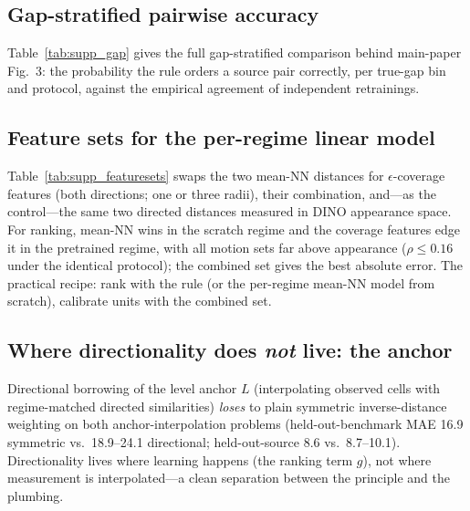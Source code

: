 \documentclass[runningheads]{llncs}
\newcommand{\pck}{PCK}
\begin{document}
\begin{table}[h]
\centering
\caption{Rule vs.\ retraining-reproducibility oracles, per variant.}
\label{tab:supp_oracles}
\small

\end{table}

\subsection{Gap-stratified pairwise accuracy}
Table~\ref{tab:supp_gap} gives the full gap-stratified comparison behind
main-paper Fig.~3: the probability the rule orders a source pair correctly,
per true-gap bin and protocol, against the empirical agreement of independent
retrainings.

\begin{table}[h]
\centering
\caption{Pairwise ordering accuracy by true \pck{} gap.}
\label{tab:supp_gap}
\small

\end{table}

\subsection{Feature sets for the per-regime linear model}
Table~\ref{tab:supp_featuresets} swaps the two mean-NN distances for
$\epsilon$-coverage features (both directions; one or three radii), their
combination, and---as the control---the same two directed distances measured
in DINO appearance space. For ranking, mean-NN wins in the scratch regime
and the coverage features edge it in the pretrained regime, with all motion
sets far above appearance ($\rho \le 0.16$ under the identical protocol);
the combined set gives the best absolute error. The practical recipe:
rank with the rule (or the per-regime mean-NN model from scratch), calibrate
units with the combined set.

\begin{table}[h]
\centering
\caption{Per-regime linear model under different feature sets. MAE is
held-out-source, anchor $+$ model.}
\label{tab:supp_featuresets}
\scriptsize
\setlength{\tabcolsep}{3.5pt}

\end{table}

\subsection{Where directionality does \emph{not} live: the anchor}
Directional borrowing of the level anchor $L$ (interpolating observed cells
with regime-matched directed similarities) \emph{loses} to plain symmetric
inverse-distance weighting on both anchor-interpolation problems
(held-out-benchmark MAE 16.9 symmetric vs.\ 18.9--24.1 directional;
held-out-source 8.6 vs.\ 8.7--10.1). Directionality lives where learning
happens (the ranking term $g$), not where measurement is interpolated---a
clean separation between the principle and the plumbing.
\end{document}
